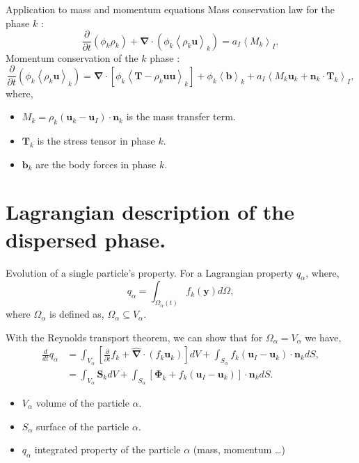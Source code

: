 \documentclass{sintefbeamer}
\newcommand{\kavg}[1]{\left<#1\right>_k}
\newcommand{\Iavg}[1]{\left<#1\right>_I}
\newcommand{\nablab}{\bm{\nabla}}
\newcommand{\nablabh}{\hat{\bm{\nabla}}}
\newcommand{\ddt}{\frac{d}{d t}}
\newcommand{\pddt}{\frac{\partial}{\partial t}}
\begin{document}
\begin{frame}
  {Application to mass and momentum equations}
  Mass conservation law for the phase $k$ :
  \begin{equation}
    \pddt (\phi_k \rho_k)
    + \nablab \cdot \left(\phi_k 
        \kavg{\rho_k \textbf{u}}
    \right) 
    = a_I\Iavg{M_k},
    \label{eq:avg_k_mass}
\end{equation}
  Momentum conservation of the $k$ phase : 
  \begin{equation}
    \pddt (\phi_k\kavg{\rho_k\textbf{u}}) 
    = \nablab\cdot\left[
        \phi_k \kavg{\textbf{T}
        - \rho_k \textbf{uu}}
    \right]
    +\phi_k\kavg{\textbf{b}}
    + a_I\Iavg{M_k \textbf{u}_k +\textbf{n}_k\cdot\textbf{T}_k},
\end{equation}
where, 
\begin{itemize}
  \item $M_k = \rho_k (\textbf{u}_k-\textbf{u}_I) \cdot \textbf{n}_k$ is the mass transfer term.
  \item $\textbf{T}_k$ is the stress tensor in phase $k$.
  \item $\textbf{b}_k$ are the body forces in phase $k$. 
\end{itemize}
\end{frame}

\section{Lagrangian description of the dispersed phase.}

\begin{frame}{Evolution of a single particle's property.}
  For a Lagrangian property $q_\alpha$, where,
  \begin{equation}
    q_\alpha
    = \int_{\Omega_\alpha(t)} f_k(\textbf{y}) d\Omega,
    \label{eq:q_alpha}
\end{equation}
where $\Omega_\alpha$ is defined as, $\Omega_\alpha \subseteq  V_\alpha$.

With the Reynolds transport theorem, we can show that for $\Omega_\alpha = V_\alpha$ we have, 
\begin{align*}
  \ddt  q_\alpha 
  &= \int_{V_\alpha}\left[ \pddt f_k + \nablabh \cdot\left(f_k\textbf{u}_k\right) \right]dV 
    + \int_{S_\alpha} f_k (\textbf{u}_I-\textbf{u}_k)\cdot \textbf{n}_k d S,\\
  &= \int_{V_\alpha} \textbf{S}_k dV 
  + \int_{S_\alpha} \left[\bm{\Phi}_k + f_k (\textbf{u}_I-\textbf{u}_k) \right] \cdot \textbf{n}_k d S.
\end{align*}
\begin{itemize}
  \item $V_\alpha$ volume of the particle $\alpha$.
  \item $S_\alpha$ surface of the particle $\alpha$.
  \item $q_\alpha$ integrated property of the particle $\alpha$ (mass, momentum \ldots)
\end{itemize}
\end{frame}
\end{document}
